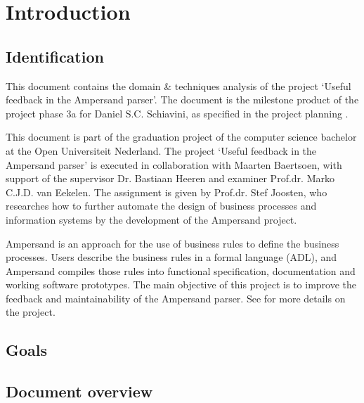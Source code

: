 \section{Introduction}
\subsection{Identification}
This document contains the domain \& techniques analysis of the project `Useful feedback in the Ampersand parser'.
The document is the milestone product of the project phase 3a for Daniel S.C. Schiavini, as specified in the project planning .

This document is part of the graduation project of the computer science bachelor at the Open Universiteit Nederland.
The project `Useful feedback in the Ampersand parser' is executed in collaboration with Maarten Baertsoen, with support of the supervisor Dr. Bastiaan Heeren and examiner Prof.dr. Marko C.J.D. van Eekelen.
The assignment is given by Prof.dr. Stef Joosten, who researches how to further automate the design of business processes and information systems by the development of the Ampersand project.

Ampersand is an approach for the use of business rules to define the business processes.
Users describe the business rules in a formal language (ADL), and Ampersand compiles those rules into functional specification, documentation and working software
prototypes.
The main objective of this project is to improve the feedback and maintainability of the Ampersand parser.
See  for more details on the project.

\subsection{Goals}
\lipsum[3]

\subsection{Document overview}
\lipsum[4]